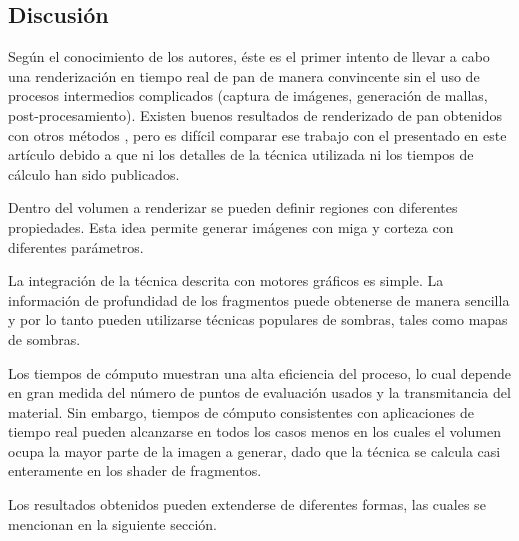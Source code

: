 \documentclass[oneside,a4paper,spanish,links]{amca}
\begin{document}
\subsection{Discusi\'on}

Según el conocimiento de los autores, éste es el primer intento de llevar a cabo una renderización en tiempo real de pan de manera convincente sin el uso de procesos
intermedios complicados (captura de imágenes, generación de mallas,
post-procesamiento). Existen buenos resultados de renderizado de pan
obtenidos con otros métodos \citep{Cho2007}, pero es difícil
comparar ese trabajo con el presentado en este artículo debido a que
ni los detalles de la técnica utilizada ni los tiempos de cálculo han
sido publicados.

Dentro del volumen a renderizar se pueden definir regiones
con diferentes propiedades. Esta idea permite generar
imágenes con miga y corteza con diferentes parámetros.

La integración de la técnica descrita con motores gráficos es
simple. La información de profundidad de los fragmentos puede obtenerse de manera sencilla y por lo tanto pueden utilizarse técnicas
populares de sombras, tales como mapas de sombras.

Los tiempos de cómputo muestran una alta eficiencia del proceso, lo
cual depende en gran medida del número de puntos de evaluación usados
y la transmitancia del material. Sin embargo, tiempos de cómputo
consistentes con aplicaciones de tiempo real pueden alcanzarse en
todos los casos menos en los cuales el volumen ocupa la mayor parte de
la imagen a generar, dado que la técnica se calcula casi enteramente
en los shader de fragmentos. 

Los resultados obtenidos pueden extenderse de diferentes formas, las
cuales se mencionan en la siguiente sección.




\end{document}
